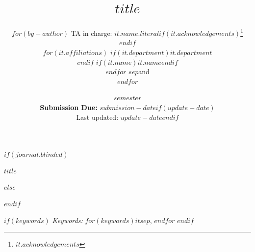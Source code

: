 

\def\spacingset#1{\renewcommand{\baselinestretch}%
{#1}\small\normalsize} \spacingset{1}



\date{
  $semester$\\[1em]
  \textbf{Submission Due:} $submission-date$$if(update-date)$\\[0.5em]
  {\small Last updated: $update-date$}$endif$
}
$if(journal.blinded)$
\spacingset{.8}
\bigskip
\bigskip
\bigskip
\begin{center}
  {\LARGE\bf $title$}
\end{center}
\smallskip
\bigskip
\spacingset{1}
$else$
\title{\bf $title$}
\author{
$for(by-author)$
TA in charge: $it.name.literal$$if(it.acknowledgements)$\thanks{$it.acknowledgements$}$endif$\\
$for(it.affiliations)$
$if(it.department)$$it.department$\\$endif$
$if(it.name)$$it.name$$endif$\\
$endfor$
$sep$and\\
$endfor$
}
\maketitle
$endif$

$if(keywords)$
\noindent%
{\it Keywords:} $for(keywords)$$it$$sep$, $endfor$
\vfill
$endif$

\spacingset{1.9} %

